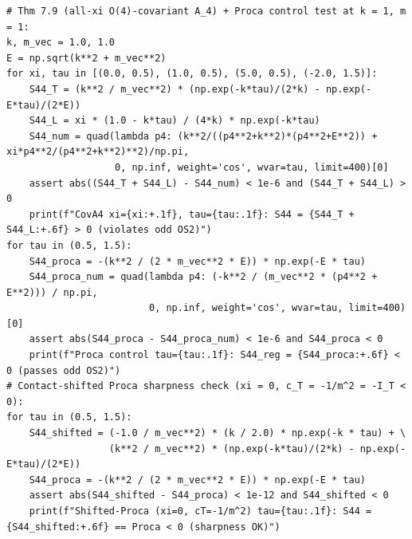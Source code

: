\documentclass[11pt,a4paper]{article}
\theoremstyle{plain}
\theoremstyle{definition}
\theoremstyle{remark}
\renewcommand{\_}{\oldunderscore\allowbreak}
\begin{document}
\begin{Verbatim}[fontsize=\scriptsize,frame=single,rulecolor=\color{darkgray}]
# Thm 7.9 (all-xi O(4)-covariant A_4) + Proca control test at k = 1, m = 1:
k, m_vec = 1.0, 1.0
E = np.sqrt(k**2 + m_vec**2)
for xi, tau in [(0.0, 0.5), (1.0, 0.5), (5.0, 0.5), (-2.0, 1.5)]:
    S44_T = (k**2 / m_vec**2) * (np.exp(-k*tau)/(2*k) - np.exp(-E*tau)/(2*E))
    S44_L = xi * (1.0 - k*tau) / (4*k) * np.exp(-k*tau)
    S44_num = quad(lambda p4: (k**2/((p4**2+k**2)*(p4**2+E**2)) + xi*p4**2/(p4**2+k**2)**2)/np.pi,
                   0, np.inf, weight='cos', wvar=tau, limit=400)[0]
    assert abs((S44_T + S44_L) - S44_num) < 1e-6 and (S44_T + S44_L) > 0
    print(f"CovA4 xi={xi:+.1f}, tau={tau:.1f}: S44 = {S44_T + S44_L:+.6f} > 0 (violates odd OS2)")
for tau in (0.5, 1.5):
    S44_proca = -(k**2 / (2 * m_vec**2 * E)) * np.exp(-E * tau)
    S44_proca_num = quad(lambda p4: (-k**2 / (m_vec**2 * (p4**2 + E**2))) / np.pi,
                         0, np.inf, weight='cos', wvar=tau, limit=400)[0]
    assert abs(S44_proca - S44_proca_num) < 1e-6 and S44_proca < 0
    print(f"Proca control tau={tau:.1f}: S44_reg = {S44_proca:+.6f} < 0 (passes odd OS2)")
# Contact-shifted Proca sharpness check (xi = 0, c_T = -1/m^2 = -I_T < 0):
for tau in (0.5, 1.5):
    S44_shifted = (-1.0 / m_vec**2) * (k / 2.0) * np.exp(-k * tau) + \
                  (k**2 / m_vec**2) * (np.exp(-k*tau)/(2*k) - np.exp(-E*tau)/(2*E))
    S44_proca = -(k**2 / (2 * m_vec**2 * E)) * np.exp(-E * tau)
    assert abs(S44_shifted - S44_proca) < 1e-12 and S44_shifted < 0
    print(f"Shifted-Proca (xi=0, cT=-1/m^2) tau={tau:.1f}: S44 = {S44_shifted:+.6f} == Proca < 0 (sharpness OK)")
\end{Verbatim}
\end{document}
